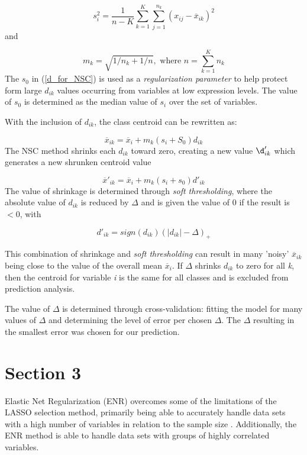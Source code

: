 \begin{equation}
\label{s2_for_NSC}
s^{2}_{i} = \frac{1}{n-K}\sum_{k=1}^{K}\sum_{j=1}^{n_k}(x_{ij} - \overline{x}_{ik})^2
\end{equation}
and

\begin{equation}
\label{m_for_NSC}
m_k = \sqrt{1/n_k + 1/n}, \text{ where } n = \sum_{k=1}^{K}n_k
\end{equation}
The $s_0$ in (\ref{d_for_NSC}) is used as a \textit{regularization parameter} to help protect form large $d_{ik}$ values occurring from variables at low expression levels. The value of $s_0$ is determined as the median value of $s_i$ over the set of variables. 

With the inclusion of $d_{ik}$, the class centroid can be rewritten as:

\begin{equation}
\label{xik_with_d_NSC}
\overline{x}_{ik} = \overline{x}_i + m_k(s_i+S_0)d_{ik}
\end{equation}
The NSC method shrinks each $d_{ik}$ toward zero, creating a new value $\d'_{ik}$ which generates a new shrunken centroid value

\begin{equation}
\label{shrunken_xik_for_NCS}
\overline{x}'_{ik} = \overline{x}_i + m_k(s_i+s_0)d'_{ik}
\end{equation}
The value of shrinkage is determined through \textit{soft thresholding}, where the absolute value of $d_{ik}$ is reduced by $\Delta$ and is given the value of 0 if the result is $<0$, with

\begin{equation}
\label{soft_thresholding_NSC}
d'_{ik} = sign(d_{ik})(|d_{ik}| - \Delta)_+
\end{equation}

This combination of shrinkage and \textit{soft thresholding} can result in many 'noisy' $\overline{x}_{ik}$ being close to the value of the overall mean $\overline{x}_i$. If $\Delta$ shrinks $d_{ik}$ to zero for all \textit{k}, then the centroid for variable \textit{i} is the same for all classes and is excluded from prediction analysis. 

The value of $\Delta$ is determined through cross-validation: fitting the model for many values of $\Delta$ and determining the level of error per chosen $\Delta$. The $\Delta$ resulting in the smallest error was chosen for our prediction.



\section{Section 3}\label{Elasitc Net Regularization}
Elastic Net Regularization (ENR) overcomes some of the limitations of the LASSO selection method, primarily being able to accurately handle data sets with a high number of variables in relation to the sample size \cite{tibshirani1996regression,efron2004least}. Additionally, the ENR method is able to handle data sets with groups of highly correlated variables. 

